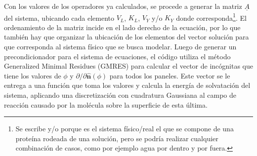 \documentclass[12pt, oneside, numbers, spanish]{ezthesis}
\numberwithin{equation}{section}
\begin{document}
Con los valores de los operadores ya calculados, se procede a generar la matriz $\underline{A}$ del sistema, ubicando cada elemento $V_L$, $K_L$, $V_Y$ y/o $K_Y$ donde corresponda\footnote{Se escribe y/o porque es el sistema físico/real el que se compone de una proteína rodeada de una solución, pero se podría realizar cualquier combinación de casos, como por ejemplo agua por dentro y por fuera.}. El ordenamiento de la matriz incide en el lado derecho de la ecuación, por lo que también hay que organizar la ubicación de los elementos del vector solución para que corresponda al sistema físico que se busca modelar. Luego de generar un precondicionador para el sistema de ecuaciones, el código utiliza el método Generalized Minimal Residues (GMRES) para calcular el vector de incógnitas que tiene los valores de $\phi$ y $\partial/\partial\hat{\mathbf{n}}(\phi)$ para todos los paneles. Este vector se le entrega a una función que toma los valores y calcula la energía de solvatación del sistema, aplicando una discretización con cuadratura Gaussiana al campo de reacción causado por la molécula sobre la superficie de esta última. 

\end{document}

